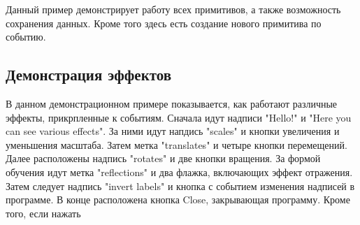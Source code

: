 \documentclass[14pt]{extarticle}
\begin{document}
		\pagebreak
	Данный пример демонстрирует работу всех примитивов, а также возможность сохранения данных. Кроме того здесь есть создание нового примитива по событию.  
	
	\subsection{Демонстрация эффектов}
	
	В данном демонстрационном примере показывается, как работают различные эффекты, прикрпленные к событиям. 
	Сначала идут надписи "Hello!" и "Here you can see various effects".
	За ними идут напдись "scales" и кнопки увеличения и уменьшения масштаба.
	Затем метка "translates" и четыре кнопки перемещений. 
	Далее расположены надпись "rotates" и две кнопки вращения.
	За формой обучения идут метка "reflections" и два флажка, включающих эффект отражения.
	Затем  следует надпись "invert labels" и кнопка с событием изменения надписей в программе.
	В конце расположена кнопка Close, закрывающая программу. 
	Кроме того, если нажать 
	
\end{document}
